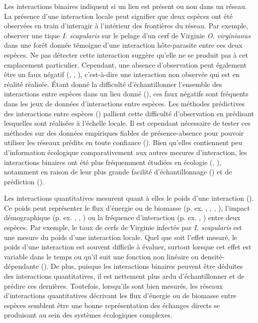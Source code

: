 Les interactions binaires indiquent si un lien est présent ou non dans un
réseau. La présence d'une interaction locale peut signifier que deux espèces ont
été observées en train d'interagir à l'intérieur des frontières du réseau. Par
exemple, observer une tique \textit{I. scapularis} sur le pelage d'un cerf de
Virginie \textit{O. virginianus} dans une forêt donnée témoigne d'une
interaction hôte-parasite entre ces deux espèces. Ne pas détecter cette
interaction suggère qu'elle ne se produit pas à cet emplacement particulier.
Cependant, une absence d'observation peut également être un faux négatif
(\cite{Bluthgen2010Why}, \cite{Chacoff2012Evaluating}, \cite{Stock2017Linear}),
c'est-à-dire une interaction non observée qui est en réalité réalisée. Étant
donné la difficulté d'échantillonner l'ensemble des interactions entre espèces
dans un lieu donné (\cite{Jordano2016Sampling}), ces faux négatifs sont
fréquents dans les jeux de données d'interactions entre espèces. Les méthodes
prédictives des interactions entre espèces (\cite{Strydom2021Roadmapa}) pallient
cette difficulté d'observation en prédisant lesquelles sont réalisées à
l'échelle locale. Il est cependant nécessaire de tester ces méthodes sur des
données empiriques fiables de présence-absence pour pouvoir utiliser les réseaux
prédits en toute confiance (\cite{Brimacombe2024Applying}). Bien qu'elles
contiennent peu d'information écologique comparativement aux autres mesures
d'interaction, les interactions binaires ont été plus fréquemment étudiées en
écologie (\cite{Pascual2006Ecological}, \cite{Delmas2019Analysing}), notamment
en raison de leur plus grande facilité d'échantillonnage
(\cite{Jordano2016Sampling}) et de prédiction (\cite{Strydom2021Roadmapa}).

Les interactions quantitatives mesurent quant à elles le poids d'une interaction
(\cite{Berlow2004Interaction}). Ce poids peut représenter le flux d'énergie ou
de biomasse (p. ex. \cite{Benke2001Food}, \cite{Post2002Long},
\cite{Bersier2002Quantitative}, \cite{Borrett2019Walk}), l'impact démographique
(p. ex. \cite{Paine1992Foodweb}, \cite{Kokkoris2002Variability},
\cite{Emmerson2004Predatorprey}) ou la fréquence d'interaction (p. ex.
\cite{Herrera1989Pollinator}, \cite{Montoya2003Food}) entre deux espèces. Par
exemple, le taux de cerfs de Virginie infectés par \textit{I. scapularis} est
une mesure du poids d'une interaction locale. Quel que soit l'effet mesuré, le
poids d'une interaction est souvent difficile à évaluer, surtout lorsque cet
effet est variable dans le temps ou qu'il suit une fonction non linéaire ou
densité-dépendante (\cite{Wootton2005Measurement}). De plus, puisque les
interactions binaires peuvent être déduites des interactions quantitatives, il
est nettement plus ardu d'échantillonner et de prédire ces dernières. Toutefois,
lorsqu'ils sont bien mesurés, les réseaux d'interactions quantitatives décrivant
les flux d'énergie ou de biomasse entre espèces semblent être une bonne
représentation des échanges directs se produisant au sein des systèmes
écologiques complexes. 

